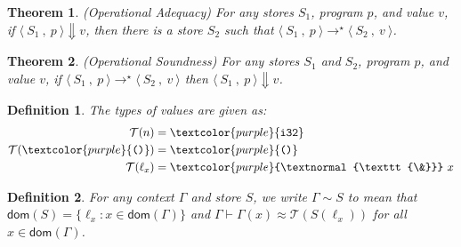 \documentclass[10pt]{article}
\newcommand{\code}[1]{\textcolor{purple}{\textnormal{\texttt{#1}}}}
\newcommand{\etyj}[3]{#1 \vdash #2 : #3}
\newcommand{\evjss}[4]{\langle \ #1 \ , \ #2 \ \rangle \longrightarrow \langle \ #3 \ , \ #4 \ \rangle}
\newcommand{\evjssm}[4]{\langle \ #1 \ , \ #2 \ \rangle \longrightarrow^\star \langle \ #3 \ , \ #4 \ \rangle}
\newtheorem*{definition}{Definition}
\newtheorem*{theorem}{Theorem}
\begin{document}
\begin{theorem}
  (Operational Adequacy) For any stores $S_1$, program $p$, and value
  $v$, if $\langle \ S_1 \ , \ p \ \rangle \Downarrow v$, then there is a store $S_2$
  such that $\evjssm {S_1} p {S_2} v$.
\end{theorem}

\begin{theorem}
  (Operational Soundness)
  For any stores $S_1$ and $S_2$, program $p$, and value $v$, if $\evjssm {S_1} p {S_2} v$ then $\langle \ S_1 \ , \ p \ \rangle \Downarrow v$.
\end{theorem}

\begin{definition}
The types of values are given as:
\begin{align*}
  \mathcal T(n) &= \code{i32} \\
  \mathcal T(\code{()}) &= \code{()} \\
  \mathcal T(\ell_x) &= \code{\&} \ x
\end{align*}
\end{definition}

\begin{definition}
  For any context $\Gamma$ and store $S$, we write $\Gamma \sim S$ to mean that $\mathsf{dom}(S) = \{ \ell_x : x \in \mathsf{dom}(\Gamma)\}$ and $\Gamma \vdash \Gamma(x) \approx \mathcal T(S(\ell_x))$ for all $x \in \mathsf{dom}(\Gamma)$.
\end{definition}



\end{document}
